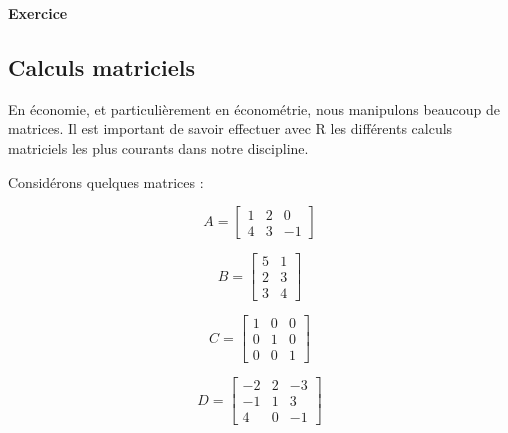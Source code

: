 \documentclass[
  11pt,
]{book}
\newcommand{\VERB}{\Verb[commandchars=\\\{\}]}
\newcommand{\ConstantTok}[1]{\textcolor[rgb]{0.56,0.35,0.01}{#1}}
\providecommand{\tightlist}{%
  \setlength{\itemsep}{0pt}\setlength{\parskip}{0pt}}
\numberwithin{equation}{section}
\numberwithin{countremarque}{section}
\newenvironment{greenbox}{
  \begin{tcolorbox}[breakable, colback=vert,coltext=black,
                  colframe=grisfonce]}
 {\end{tcolorbox}}
\begin{document}
\begin{greenbox}

\textbf{Exercice}


\end{greenbox}

\hypertarget{calculs-matriciels}{%
\subsection{Calculs matriciels}\label{calculs-matriciels}}

En économie, et particulièrement en économétrie, nous manipulons beaucoup de matrices. Il est important de savoir effectuer avec R les différents calculs matriciels les plus courants dans notre discipline.

Considérons quelques matrices :

\[A = \begin{bmatrix}1 & 2 & 0\\ 4 & 3 & -1\end{bmatrix}\]

\[B = \begin{bmatrix}5 & 1\\ 2 & 3\\ 3 & 4\end{bmatrix}\]

\[C = \begin{bmatrix}1 & 0 & 0 \\ 0 & 1 & 0 \\ 0 & 0 & 1\end{bmatrix}\]

\[D = \begin{bmatrix}-2 & 2 & -3 \\ -1 & 1 & 3\\4 & 0 & -1\end{bmatrix}\]
\end{document}
